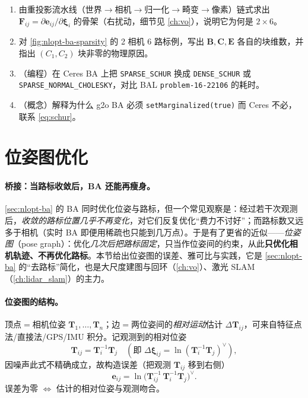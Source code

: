 \begin{practice}
\begin{enumerate}
  \item 由重投影流水线（世界$\to$相机$\to$归一化$\to$畸变$\to$像素）链式求出 $\mathbf{F}_{ij}=\partial\mathbf{e}_{ij}/\partial\boldsymbol{\xi}_i$ 的骨架（右扰动，细节见 \cref{ch:vo}），说明它为何是 $2\times6$。
  \item 对 \cref{fig:nlopt-ba-sparsity} 的 2 相机 6 路标例，写出 $\mathbf{B},\mathbf{C},\mathbf{E}$ 各自的块维数，并指出 $(C_1,C_2)$ 块非零的物理原因。
  \item （编程）在 Ceres BA 上把 \texttt{SPARSE\_SCHUR} 换成 \texttt{DENSE\_SCHUR} 或 \texttt{SPARSE\_NORMAL\_CHOLESKY}，对比 BAL \texttt{problem-16-22106} 的耗时。
  \item （概念）解释为什么 g2o BA 必须 \texttt{setMarginalized(true)} 而 Ceres 不必，联系 \cref{eq:schur}。
\end{enumerate}
\end{practice}

\section{位姿图优化}
\label{sec:nlopt-posegraph}

\paragraph{桥接：当路标收敛后，BA 还能再瘦身。}\cite{gaoxiang2019slam14}
\cref{sec:nlopt-ba} 的 BA 同时优化位姿与路标，但一个常见观察是：经过若干次观测后，\emph{收敛的路标位置几乎不再变化}，对它们反复优化“费力不讨好”；而路标数又远多于相机（实时 BA 即便用稀疏也只能到几万点）\cite{gaoxiang2019slam14}。于是有了更省的近似——\emph{位姿图}（pose graph）：优化\emph{几次后把路标固定}，只当作位姿间的约束，从此\textbf{只优化相机轨迹、不再优化路标}。本节给出位姿图的误差、雅可比与实践，它是 \cref{sec:nlopt-ba} 的“去路标”简化，也是大尺度建图与回环（\cref{ch:vo}）、激光 SLAM（\cref{ch:lidar_slam}）的主力。

\paragraph{位姿图的结构。}\cite{gaoxiang2019slam14}
顶点$=$相机位姿 $\mathbf{T}_1,\dots,\mathbf{T}_n$；边$=$两位姿间的\emph{相对运动}估计 $\Delta\mathbf{T}_{ij}$，可来自特征点法/直接法/GPS/IMU 积分。记观测到的相对位姿
\begin{equation}
  \mathbf{T}_{ij}=\mathbf{T}_i^{-1}\mathbf{T}_j\quad(\text{即 }\Delta\boldsymbol{\xi}_{ij}=\ln(\mathbf{T}_i^{-1}\mathbf{T}_j)^\vee),
  \label{eq:nlopt-pg-meas}
\end{equation}
因噪声此式不精确成立，故构造误差（把观测 $\mathbf{T}_{ij}$ 移到右侧）
\begin{equation}
  \mathbf{e}_{ij}=\ln\!\big(\mathbf{T}_{ij}^{-1}\,\mathbf{T}_i^{-1}\mathbf{T}_j\big)^\vee.
  \label{eq:nlopt-pg-err}
\end{equation}
误差为零 $\iff$ 估计的相对位姿与观测吻合。

